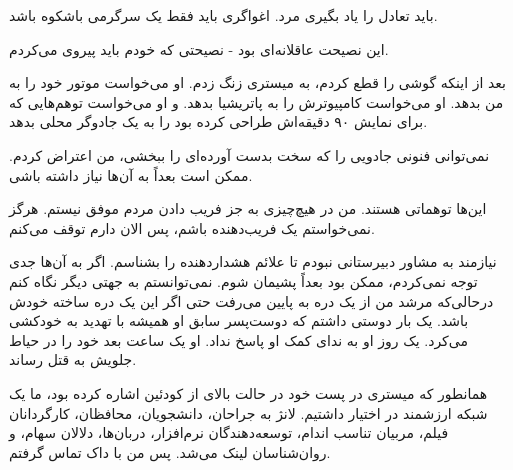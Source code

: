 باید تعادل را یاد بگیری مرد. اغواگری باید فقط یک سرگرمی باشکوه باشد.

این نصیحت عاقلانه‌ای بود - نصیحتی که خودم باید پیروی می‌کردم.

بعد از اینکه گوشی را قطع کردم، به میستری زنگ زدم. او می‌خواست موتور خود را به من بدهد. او می‌خواست کامپیوترش را به پاتریشیا بدهد. و او می‌خواست توهم‌هایی که برای نمایش ۹۰ دقیقه‌اش طراحی کرده بود را به یک جادوگر محلی بدهد.

نمی‌توانی فنونی جادویی را که سخت بدست آورده‌ای را ببخشی، من اعتراض کردم. ممکن است بعداً به آن‌ها نیاز داشته باشی.

این‌ها توهماتی هستند. من در هیچ‌چیزی به جز فریب دادن مردم موفق نیستم. هرگز نمی‌خواستم یک فریب‌دهنده باشم، پس الان دارم توقف می‌کنم.

نیازمند به مشاور دبیرستانی نبودم تا علائم هشداردهنده را بشناسم. اگر به آن‌ها جدی توجه نمی‌کردم، ممکن بود بعداً پشیمان شوم. نمی‌توانستم به جهتی دیگر نگاه کنم درحالی‌که مرشد من از یک دره به پایین می‌رفت حتی اگر این یک دره ساخته خودش باشد. یک بار دوستی داشتم که دوست‌پسر سابق او همیشه با تهدید به خودکشی می‌کرد. یک روز او به ندای کمک او پاسخ نداد. او یک ساعت بعد خود را در حیاط جلویش به قتل رساند.

همانطور که میستری در پست خود در حالت بالای از کودئین اشاره کرده بود، ما یک شبکه ارزشمند در اختیار داشتیم. لانژ به جراحان، دانشجویان، محافظان، کارگردانان فیلم، مربیان تناسب اندام، توسعه‌دهندگان نرم‌افزار، دربان‌ها، دلالان سهام، و روان‌شناسان لینک می‌شد. پس من با داک تماس گرفتم.